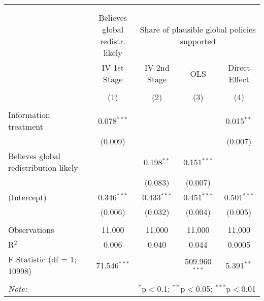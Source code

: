 
\begin{tabular}{@{\extracolsep{5pt}}lcccc} 
\\[-1.8ex]\hline 
\hline \\[-1.8ex] 
\\[-1.8ex] & \makecell{Believes global\\redistr. likely} & \multicolumn{3}{c}{Share of plausible global policies supported} \\ 
 & IV 1st Stage & IV 2nd Stage & OLS & Direct Effect \\ 
\\[-1.8ex] & (1) & (2) & (3) & (4)\\ 
\hline \\[-1.8ex] 
 Information treatment & 0.078$^{***}$ &  &  & 0.015$^{**}$ \\ 
  & (0.009) &  &  & (0.007) \\ 
  Believes global redistribution likely &  & 0.198$^{**}$ & 0.151$^{***}$ &  \\ 
  &  & (0.083) & (0.007) &  \\ 
  (Intercept) & 0.346$^{***}$ & 0.433$^{***}$ & 0.451$^{***}$ & 0.501$^{***}$ \\ 
  & (0.006) & (0.032) & (0.004) & (0.005) \\ 
 \hline \\[-1.8ex] 
Observations & 11,000 & 11,000 & 11,000 & 11,000 \\ 
R$^{2}$ & 0.006 & 0.040 & 0.044 & 0.0005 \\ 
F Statistic (df = 1; 10998) & 71.546$^{***}$ &  & 509.960$^{***}$ & 5.391$^{**}$ \\ 
\hline 
\hline \\[-1.8ex] 
\textit{Note:}  & \multicolumn{4}{r}{$^{*}$p$<$0.1; $^{**}$p$<$0.05; $^{***}$p$<$0.01} \\ 
\end{tabular} 
